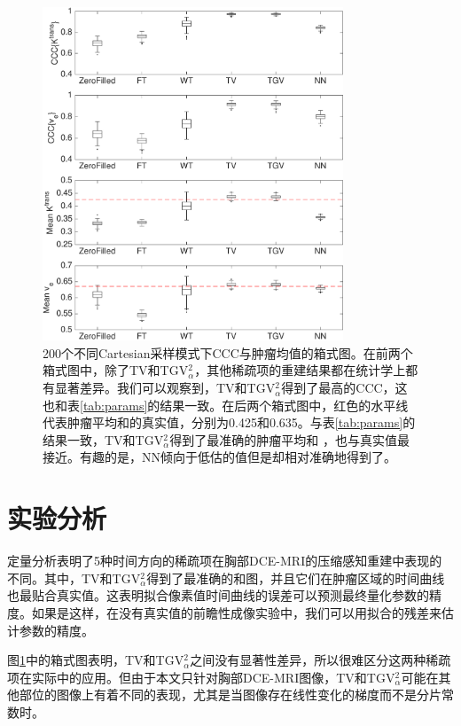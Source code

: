 \begin{figure}[htbp]
\centerline{
    \includegraphics[width=0.8\textwidth]{img/qetsr/figure7.eps}
}
\caption{
200个不同Cartesian采样模式下CCC与肿瘤均值的箱式图。在前两个箱式图中，除了TV和TGV$_{\alpha}^2$，其他稀疏项的重建结果都在统计学上都有显著差异。我们可以观察到，TV和TGV$_{\alpha}^2$得到了最高的CCC，这也和表\ref{tab:params}的结果一致。在后两个箱式图中，红色的水平线代表肿瘤平均\kt 和\Ve 的真实值，分别为0.425和0.635。与表\ref{tab:params}的结果一致，TV和TGV$_{\alpha}^2$得到了最准确的肿瘤平均\kt 和 \Ve，也与真实值最接近。有趣的是，NN倾向于低估\kt 的值但是却相对准确地得到了\Ve。
}
\label{fig:paramsbp}
\end{figure}

\section{实验分析}
定量分析表明了5种时间方向的稀疏项在胸部DCE-MRI的压缩感知重建中表现的不同。其中，TV和TGV$_{\alpha}^2$得到了最准确的\kt 和\Ve 图，并且它们在肿瘤区域的时间曲线也最贴合真实值。这表明拟合像素值时间曲线的误差可以预测最终量化参数的精度。如果是这样，在没有真实值的前瞻性成像实验中，我们可以用拟合的残差来估计参数的精度。

图\ref{fig:paramsbp}中的箱式图表明，TV和TGV$_{\alpha}^2$之间没有显著性差异，所以很难区分这两种稀疏项在实际中的应用。但由于本文只针对胸部DCE-MRI图像，TV和TGV$_{\alpha}^2$可能在其他部位的图像上有着不同的表现，尤其是当图像存在线性变化的梯度而不是分片常数时。

